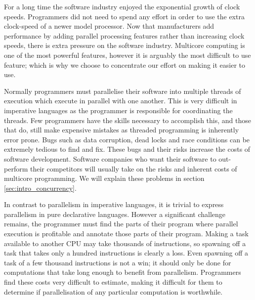 For a long time the software industry enjoyed the exponential growth of
clock speeds.
Programmers did not need to spend any effort in order to use the extra
clock-speed of a newer model processor.
Now that manufacturers add performance by adding parallel processing
features rather than increasing clock speeds,
there is extra pressure on the software industry.
Multicore computing is one of the most powerful features,
however it is arguably the most difficult to use feature;
which is why we choose to concentrate our effort on making it easier to use.

Normally programmers must parallelise their software into multiple
threads of execution which execute in parallel with one another.
This is very difficult in imperative languages as the programmer is
responsible for coordinating the threads.
Few programmers have the skills necessary to accomplish this,
and those that do, still make expensive mistakes as
threaded programming is inherently error prone. 
Bugs such as data corruption, dead locks and race conditions
can be extremely tedious to find and fix.
These bugs and their risks increase the costs of software development.
Software companies who want their software to out-perform their competitors
will usually take on the risks and inherent costs of multicore programming.
We will explain these problems in section \ref{sec:intro_concurrency}.

In contrast to parallelism in imperative languages,
it is trivial to express parallelism in pure declarative languages.
However a significant challenge remains,
the programmer must find the parts of their program where parallel execution
is profitable and annotate those parts of their program.
Making a task available to another CPU
may take thousands of instructions,
so spawning off a task that takes only a hundred instructions is clearly a
loss.
Even spawning off a task of a few thousand instructions is not a win;
it should only be done for computations
that take long enough to benefit from parallelism.
Programmers find these costs very difficult to estimate,
making it difficult for them to determine if parallelisation of
any particular computation is worthwhile.

